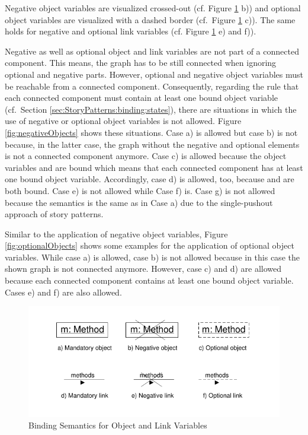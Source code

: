 Negative object variables are visualized crossed-out (cf. Figure
\ref{fig:bindingSemanticsOverview} b)) and optional object variables are
visualized with a dashed border (cf.\ Figure \ref{fig:bindingSemanticsOverview} c)).
The same holds for negative and optional link variables (cf. Figure
\ref{fig:bindingSemanticsOverview} e) and f)).

Negative as well as optional object and link variables are not part of a
connected component.
This means, the graph has to be still connected when ignoring optional and negative
parts. However, optional and negative object variables must be reachable from a connected component. 
Consequently, regarding the rule that each connected component must
contain at least one bound object variable (cf.\ Section
\ref{sec:StoryPatterns:binding:states}), there are situations in which the
use of negative or optional object variables is not allowed. 
Figure \ref{fig:negativeObjects} shows these situations. 
Case a) is allowed but case b) is not because, in the latter case,
the graph without the negative and optional elements is not a connected component anymore.
Case c) is allowed because the object
variables  and  are bound which means that each connected component has at least one bound object variable.
Accordingly, case d) is allowed, too, because  and  are both
bound. Case e) is not allowed while Case f) is.
Case g) is not allowed because the semantics is the same as in Case a) due to the single-pushout approach of story patterns.

Similar to the application of negative object
variables, Figure \ref{fig:optionalObjects} shows some examples for the application of optional object variables. 
While case a) is allowed, case b) is not allowed because in this case the
shown graph is not connected anymore. However, case c) and d) are allowed
because each connected component contains at least one bound object variable.
Cases e) and f) are also allowed.

\begin{figure}[htbp]
  \centering
  \includegraphics[scale=1.2]{figures/BindingSemanticsOverview}
  \caption{Binding Semantics for Object and Link Variables}
  \label{fig:bindingSemanticsOverview}
\end{figure}

